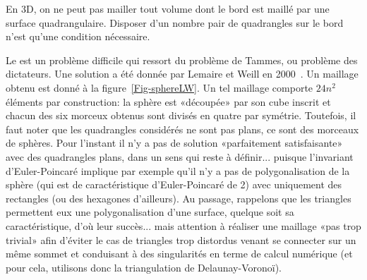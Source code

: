 En 3D, on ne peut pas mailler tout volume dont le bord est maillé par une surface quadrangulaire.
Disposer d'un nombre pair de quadrangles sur le bord n'est qu'une condition nécessaire.

Le  est un problème difficile qui ressort du problème de Tammes, ou problème des dictateurs. Une solution a été donnée par Lemaire et Weill en 2000~\cite{bib-LemW}. Un maillage obtenu est donné à la figure~\ref{Fig-sphereLW}. Un tel maillage comporte $24n^2$ éléments par construction: la sphère est «découpée» par son cube inscrit et chacun des six morceux obtenus sont divisés en quatre par symétrie. Toutefois, il faut noter que les quadrangles considérés ne sont pas plans, ce sont des morceaux de sphères. Pour l'instant il n'y a pas de solution «parfaitement satisfaisante» avec des quadrangles plans, dans un sens qui reste à définir... puisque l'invariant d'Euler-Poincaré implique par exemple qu'il n'y a pas de polygonalisation de la sphère (qui est de caractéristique d'Euler-Poincaré de 2) avec uniquement des rectangles (ou des hexagones d'ailleurs). Au passage, rappelons que les triangles permettent eux une polygonalisation d'une surface, quelque soit sa caractéristique, d'où leur succès... mais attention à réaliser une maillage «pas trop trivial» afin d'éviter le cas de triangles trop distordus venant se connecter sur un même sommet et conduisant à des singularités en terme de calcul numérique (et pour cela, utilisons donc la triangulation de Delaunay-Voronoï).

